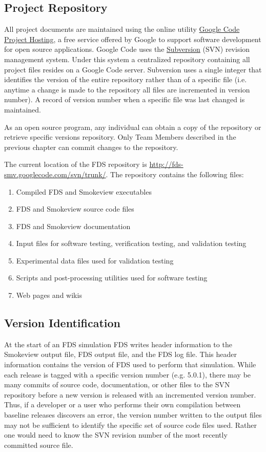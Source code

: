 \documentclass[11pt]{book}
\begin{document}
\subsection{Project Repository}

All project documents are maintained using the online utility \href{http://code.google.com/opensource}{{Google Code Project Hosting}}, a free service
offered by Google to support software development for open source applications.  Google Code uses the \href{http://subversion.tigris.org}{{Subversion}} (SVN) revision management system.
Under this system a centralized repository containing all project files resides on a Google Code server.
Subversion uses a single integer that identifies the version of the entire repository rather than of a specific file
(i.e. anytime a change is made to the repository all files are incremented in version number).  A record of version number when a specific file was last changed is maintained.

As an open source program, any individual can obtain a copy of the repository or retrieve specific versions
repository.  Only Team Members described in the previous chapter can commit changes to the repository.

The current location of the FDS repository is \href{http://fds-smv.googlecode.com/svn/trunk/}
{{\ct http://fds-smv.googlecode.com/svn/trunk/}}. The repository contains the following files:
\begin{enumerate}
\item Compiled FDS and Smokeview executables
\item FDS and Smokeview source code files
\item FDS and Smokeview documentation
\item Input files for software testing, verification testing, and validation testing
\item Experimental data files used for validation testing
\item Scripts and post-processing utilities used for software testing
\item Web pages and wikis
\end{enumerate}

\subsection{Version Identification}

At the start of an FDS simulation FDS writes header information to the Smokeview output file, FDS output file,
and the FDS log file.  This header information contains the version of FDS used to perform that simulation.
While each release is tagged with a specific version number (e.g. 5.0.1), there may be many commits of source
code, documentation, or other files to the SVN repository before a new version is released with an incremented
version number.  Thus, if a developer or a user who performs their own compilation between baseline releases
discovers an error, the version number written to the output files may not be sufficient to identify the
specific set of source code files used.  Rather one would need to know the SVN revision number of the most
recently committed source file.
\end{document}
